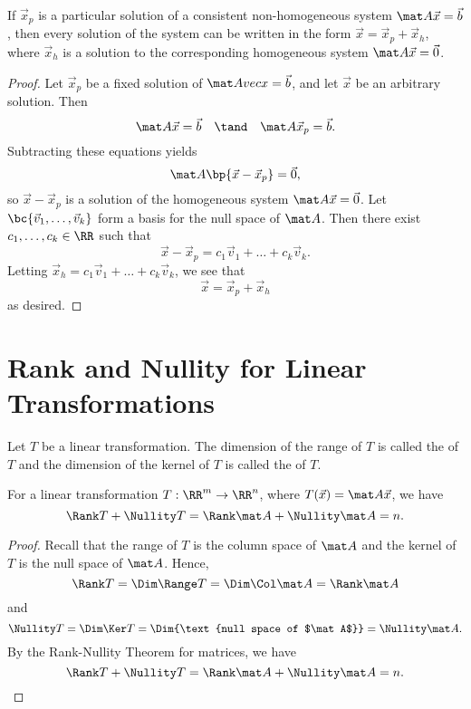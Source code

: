 \begin{proposition}
    If $\vec x_p$ is a particular solution of a consistent non-homogeneous system $\mat A \vec x = \vec b$, then every solution of the system can be written in the form $\vec x = \vec x_p + \vec x_h$, where $\vec x_h$ is a solution to the corresponding homogeneous system $\mat A \vec x = \vec 0$.
\end{proposition}
\begin{proof}
    Let $\vec x_p$ be a fixed solution of $\mat A vec x = \vec b$, and let $\vec x$ be an arbitrary solution. Then \[\mat A \vec x = \vec b \quad \tand \quad \mat A \vec x_p = \vec b.\] Subtracting these equations yields \[\mat A \bp{\vec x - \vec x_p} = \vec 0,\] so $\vec x - \vec x_p$ is a solution of the homogeneous system $\mat A \vec x = \vec 0$. Let $\bc{\vec v_1, \dots, \vec v_k}$ form a basis for the null space of $\mat A$. Then there exist $c_1, \dots, c_k \in \RR$ such that \[\vec x - \vec x_p = c_1 \vec v_1 + \dots + c_k \vec v_k.\] Letting $\vec x_h = c_1 \vec v_1 + \dots + c_k \vec v_k$, we see that \[\vec x = \vec x_p + \vec x_h\] as desired.
\end{proof}

\section{Rank and Nullity for Linear Transformations}

\begin{definition}
    Let $T$ be a linear transformation. The dimension of the range of $T$ is called the  of $T$ and the dimension of the kernel of $T$ is called the  of $T$.
\end{definition}

\begin{theorem}
    For a linear transformation $T : \RR^m \to \RR^n$, where $T(\vec x) = \mat A \vec x$, we have \[\Rank T + \Nullity T = \Rank \mat A + \Nullity \mat A = n.\]
\end{theorem}
\begin{proof}
    Recall that the range of $T$ is the column space of $\mat A$ and the kernel of $T$ is the null space of $\mat A$. Hence, \[\Rank T = \Dim \Range T = \Dim \Col \mat A = \Rank \mat A\] and \[\Nullity T = \Dim \Ker T = \Dim{\text{null space of $\mat A$}} = \Nullity \mat A.\] By the Rank-Nullity Theorem for matrices, we have \[\Rank T + \Nullity T = \Rank \mat A + \Nullity \mat A = n.\]
\end{proof}